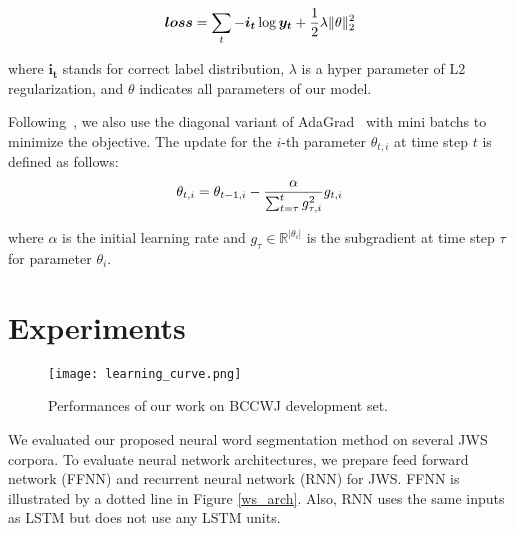 \documentclass[11pt,letterpaper]{article}
\begin{document}
\begin{equation} 
 \bm{loss} = \sum_{t} -\bm{i_t} \log \bm{y_t} +  \frac{1}{2}\lambda \|\theta\|_{2}^2
 \vspace{6pt}
 \end{equation}



\noindent
where $\bm{i_{t}}$ stands for correct label distribution, $\lambda$ is a hyper parameter of L2 regularization, and $\theta$ indicates all parameters of our model. 
 
Following~\cite{socher2013parsing}, we also use the diagonal variant of AdaGrad~\cite{duchi2011adaptive} with mini batchs to minimize the objective. The update for the  $i$-th parameter $\theta_{t,i}$ at time step $t$  is defined as follows:
\begin{equation}
\theta_{t,i} = \theta_{t-1,i} - \frac{\alpha }{\sum^{t}_{t=\tau} g^{2}_{\tau,i}}g_{t,i} 
\vspace{6pt}
\end{equation}

\noindent
where $\alpha$ is the initial learning rate and $g_{\tau} \in \mathbb{R}^{|\theta_{i}|} $ is the subgradient at time step $\tau$ for parameter $\theta_{i}$. 







 
\section{Experiments}
\begin{figure}[t]    
 \begin{center}    
 \texttt{[image: learning\_curve.png]}              
 \caption{Performances of our work on BCCWJ development set.}    
 \label{learning_curve}    
\end{center}    
\end{figure}




We evaluated our proposed neural word segmentation method on several JWS corpora.
To evaluate neural network architectures, we prepare feed forward network (FFNN) and recurrent neural network (RNN) for JWS. FFNN is illustrated by a dotted line in Figure \ref{ws_arch}. Also, RNN uses the same inputs as LSTM but does not use any LSTM units.
\end{document}
